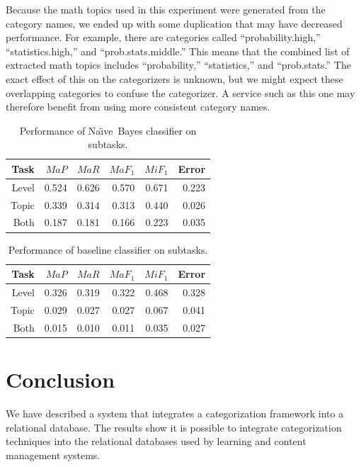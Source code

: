 \documentclass{article}
\newcommand{\naive}{Na\"\i ve}
\begin{document}
Because the math topics used in this experiment were generated from
the category names, we ended up with some duplication that may have
decreased performance.  For example, there are categories called
``probability.high,'' ``statistics.high,'' and ``prob.stats.middle.''
This means that the combined list of extracted math topics includes
``probability,'' ``statistics,'' and ``prob.stats.''  The exact effect
of this on the categorizers is unknown, but we might expect these
overlapping categories to confuse the categorizer.  A service such as
this one may therefore benefit from using more consistent category
names.


\begin{table}
\begin{tabular}{|r|r|r|r|r|r|}
\hline
Task     & $MaP$   & $MaR$   & $MaF_1$ & $MiF_1$ & Error \\ \hline
Level    & 0.524   & 0.626   & 0.570   & 0.671   & 0.223 \\ \hline
Topic    & 0.339   & 0.314   & 0.313   & 0.440   & 0.026 \\ \hline
Both     & 0.187   & 0.181   & 0.166   & 0.223   & 0.035 \\ \hline
\end{tabular}
\caption{Performance of \naive\ Bayes classifier on subtasks.}
\label{results-NB}
\end{table}

\begin{table}
\begin{tabular}{|r|r|r|r|r|r|}
\hline
Task     & $MaP$   & $MaR$   & $MaF_1$ & $MiF_1$ & Error \\ \hline
Level    & 0.326   & 0.319   & 0.322   & 0.468   & 0.328 \\ \hline
Topic    & 0.029   & 0.027   & 0.027   & 0.067   & 0.041 \\ \hline
Both     & 0.015   & 0.010   & 0.011   & 0.035   & 0.027 \\ \hline
\end{tabular}
\caption{Performance of baseline classifier on subtasks.}
\label{results-baseline}
\end{table}


 
\section{Conclusion}

We have described a system that integrates a categorization framework into a 
relational database. The results show it is possible to integrate categorization 
techniques into the relational databases used by learning and content management 
systems.
\end{document}
